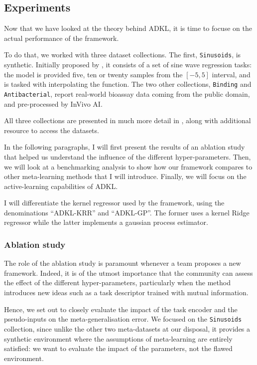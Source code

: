 \documentclass[11pt]{article}
\numberwithin{equation}{subsection}
\begin{document}
\subsection{Experiments}

Now that we have looked at the theory behind ADKL, it is time to focuse on the actual performance of the framework.

To do that, we worked with three dataset collections. The first, \texttt{Sinusoids}, is synthetic. Initially proposed by \citet{kim2018bayesian}, it consists of a set of sine wave regression tasks: the model is provided five, ten or twenty samples from the $[-5, 5]$ interval, and is tasked with interpolating the function. The two other collections, \texttt{Binding} and \texttt{Antibacterial}, report real-world bioassay data coming from the public domain, and pre-processed by InVivo AI.

All three collections are presented in much more detail in , along with additional resource to access the datasets.

In the following paragraphs, I will first present the results of an ablation study that helped us understand the influence of the different hyper-parameters. Then, we will look at a benchmarking analysis to show how our framework compares to other meta-learning methods that I will introduce. Finally, we will focus on the active-learning capabilities of ADKL.

I will differentiate the kernel regressor used by the framework, using the denominations ``ADKL-KRR'' and ``ADKL-GP''. The former uses a kernel Ridge regressor while the latter implements a gaussian process estimator.

\subsubsection{Ablation study}

The role of the ablation study is paramount whenever a team proposes a new framework. Indeed, it is of the utmost importance that the community can assess the effect of the different hyper-parameters, particularly when the method introduces new ideas such as a task descriptor trained with mutual information.

Hence, we set out to closely evaluate the impact of the task encoder and the pseudo-inputs on the meta-generalisation error. We focused on the \texttt{Sinusoids} collection, since unlike the other two meta-datasets at our disposal, it provides a synthetic environment where the assumptions of meta-learning are entirely satisfied: we want to evaluate the impact of the parameters, not the flawed environment.
\end{document}
